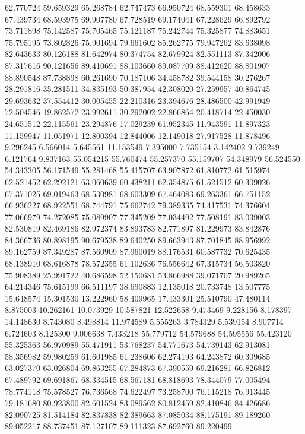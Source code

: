 62.770724
59.659329
65.268784
62.747473
66.950724
68.559301
68.458633
67.439734
68.593975
69.907780
67.728519
69.174041
67.228629
66.892792
73.711898
75.142587
75.705465
75.121187
75.242744
75.325877
74.883651
75.795195
73.802826
75.901694
79.661602
85.262775
79.947262
83.638098
82.643633
80.126188
81.642974
80.374754
82.679924
82.551113
87.342006
87.317616
90.121656
89.410691
88.103660
89.087709
88.412620
88.801907
88.890548
87.738898
60.261690
70.187106
34.458782
39.544158
30.276267
28.291816
35.281511
34.835193
50.387954
42.308020
27.259957
40.864745
29.693632
37.554412
30.005455
22.210316
23.394676
28.486500
42.991949
72.504546
19.862572
23.992611
30.292002
22.866864
20.418714
22.450030
24.651512
22.115561
23.294876
17.029239
61.952345
11.943591
11.897323
11.159947
11.051971
12.800394
12.844006
12.149018
27.917528
11.878496
9.296245
6.566014
5.645561
11.153549
7.395000
7.735154
3.142402
9.739249
6.121764
9.837163
55.054215
55.760474
55.257370
55.159707
54.348979
56.524550
54.343305
56.171549
55.281468
55.415707
63.907872
61.810772
61.515974
62.521452
62.292121
63.060639
60.438211
62.354875
61.521512
60.309026
67.371025
69.019463
68.530981
68.603309
67.464083
69.263361
66.751152
66.936227
68.922551
68.744791
75.662742
79.389335
74.417531
74.376604
77.066979
74.272085
75.089907
77.345209
77.034492
77.508191
83.039003
82.530819
82.469186
82.972374
83.893783
82.771897
81.229973
83.842876
84.366736
80.898195
90.679538
89.640250
89.663943
87.701845
88.956992
89.162759
87.349287
87.560909
87.960019
88.176531
60.587732
70.625435
68.138910
68.616878
78.572355
61.102636
76.556642
67.315734
56.503820
75.908389
25.991722
40.686598
52.150681
53.866988
39.071707
20.989265
64.214346
75.615199
66.511197
38.690883
12.135018
20.733748
13.507775
15.648574
15.301530
13.222960
58.409965
17.433301
25.510790
47.480114
8.875003
10.262161
10.073929
10.587821
12.522658
9.473469
9.228156
8.178397
14.148630
8.743080
8.498814
11.974589
5.555263
3.784329
5.539154
8.907714
6.724603
8.125300
9.006638
7.433218
55.779712
54.579688
54.595556
55.423120
55.325363
56.970989
55.471911
53.768237
54.771673
54.739143
62.913081
58.356982
59.980259
61.601985
61.238606
62.274193
64.243872
60.309685
63.027370
63.026804
69.863255
67.284873
67.390559
69.216281
66.826812
67.489792
69.691867
68.334515
68.567181
68.818693
78.344079
77.005494
78.774118
75.578527
76.736568
74.622497
73.258700
76.115218
76.913445
79.181680
80.923800
82.601524
83.089562
80.812459
82.410846
84.426686
82.090725
81.514184
82.837838
82.389663
87.085034
88.175191
89.189260
89.052217
88.737451
87.127107
89.111323
87.692760
89.220499
